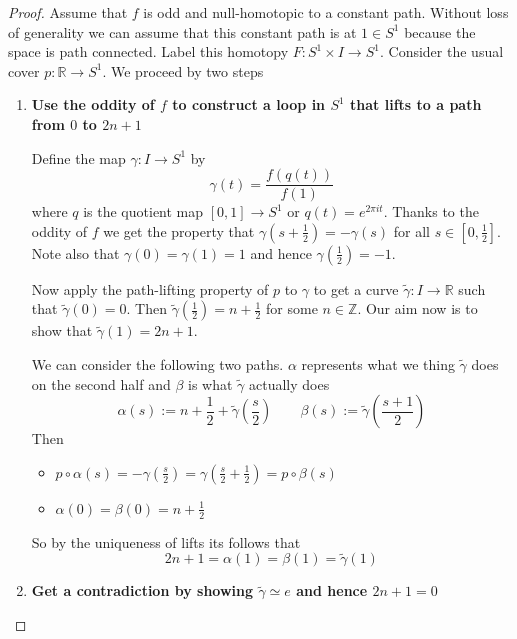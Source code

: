 \documentclass[11pt]{article}
\newcommand{\defeq}{:=}
\newcommand{\R}{\mathbb{R}}
\newcommand{\Z}{\mathbb{Z}}
\begin{document}
\begin{proof}
Assume that $f$ is odd and null-homotopic to a constant path.
Without loss of generality we can assume that this constant path is at $1\in S^1$ because the space is path connected.
Label this homotopy $F:S^1\times I \to S^1$.
Consider the usual cover $p:\R\to S^1$.
We proceed by two steps
\begin{enumerate}
	\item \textbf{Use the oddity of $f$ to construct a loop in $S^1$ that lifts to a path from $0$ to $2n+1$}

		Define the map $\gamma:I \to S^1$ by  
		\[
			\gamma(t)=\frac{f(q(t))}{f(1)}
		\]
		where $q$ is the quotient map $[0,1]\to S^1$ or $q(t)=e^{2\pi i t}$.
		Thanks to the oddity of $f$ we get the property that
		$\gamma(s+\frac{1}{2})=-\gamma(s)$ for all $s\in[0 , \frac{1}{2}]$.
		Note also that $\gamma(0)=\gamma(1)=1$ and hence $\gamma(\frac{1}{2})=-1$.

		Now apply the path-lifting property of $p$ to $\gamma$ to get a curve $\widetilde{\gamma}:I\to \R$  such that $\widetilde{\gamma}(0)=0$.
		Then $\widetilde{\gamma}(\frac{1}{2})=n+\frac{1}{2}$ for some $n\in\Z$.
		Our aim now is to show that $\widetilde{\gamma}(1)=2n+1$.

		We can consider the following two paths.
		$\alpha$ represents what we thing $\widetilde{\gamma}$ does on the second half and $\beta$ is what $\widetilde{\gamma}$ actually does
		\[
			\alpha(s)\defeq n+\frac{1}{2}+\widetilde{\gamma}\left(\frac{s}{2}\right)
		\quad\quad	\beta (s)\defeq \widetilde{\gamma}\left(\frac{s+1}{2}\right)
		\]
		Then
		\begin{itemize}
			\item $p\circ\alpha(s)=-\gamma(\frac{s}{2})=\gamma(\frac{s}{2}+\frac{1}{2})=p\circ\beta(s)$
			\item $\alpha(0)=\beta(0)=n+\frac{1}{2}$
		\end{itemize}
		So by the uniqueness of lifts its follows that
		\[
			2n+1 = \alpha(1) = \beta(1) = \widetilde{\gamma}(1)
		\]
	
	\item \textbf{Get a contradiction by showing $\widetilde{\gamma}\simeq e$ and hence $2n+1 = 0$}


\end{enumerate}
\end{proof}
\end{document}
